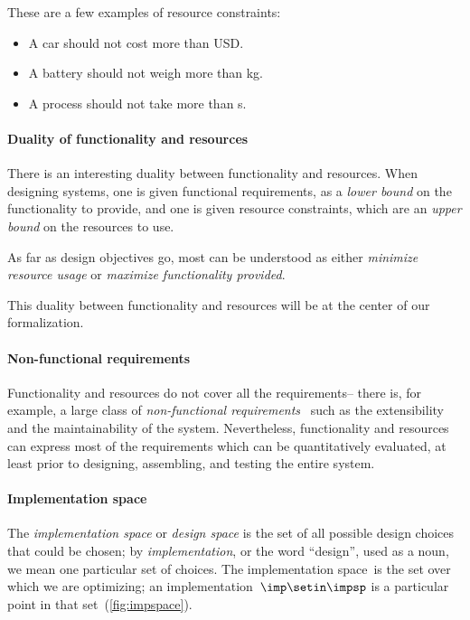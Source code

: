 \begin{example}
    These are a few examples of resource constraints:
    \begin{itemize}
        \item A car should not cost more than \unit[15,000]{USD}.
        \item A battery should not weigh more than \unit[1]{kg}.
        \item A process should not take more than \unit[10]{s}.
    \end{itemize}
\end{example}

\paragraph{Duality of functionality and resources}

There is an interesting duality between functionality and resources.
When designing systems, one is given functional requirements, as a \emph{lower bound} on the functionality to provide,
and one is given resource constraints, which are an \emph{upper bound} on the resources to use.

As far as design objectives go, most can be understood as either \emph{minimize resource usage}
or \emph{maximize functionality provided}.

This duality between functionality and resources will be at the center of our formalization.

\paragraph{Non-functional requirements}

Functionality and resources do not cover all the requirements-- there is, for example, a large class of \emph{non-functional requirements}~\cite{deweck2011} such as the extensibility and the maintainability of the system.
Nevertheless, functionality and resources can express most of the requirements which can be quantitatively evaluated, at least prior to designing, assembling, and testing the entire system.

\paragraph{Implementation space}

The \emph{implementation space} or \textit{design space} is the set of all possible design choices that could be chosen; by \textit{implementation}, or the word ``design'', used as a noun, we mean one particular set of choices.
The implementation space~\impsp is the set over which we are optimizing; an implementation~$\imp\setin\impsp$ is a particular point in that set~(\cref{fig:impspace}).


